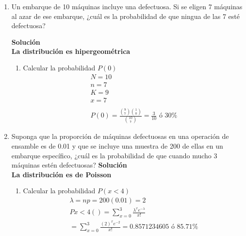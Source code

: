 \begin{enumerate}
    \item Un embarque de 10 máquinas incluye una defectuosa. Si se eligen 7 máquinas al azar de ese embarque, ¿cuál es la probabilidad de que ningua de las 7 esté defectuosa?
    
    \textbf{Solución}\\
    \textbf{La distribución es hipergeométrica}
    \begin{enumerate}
        
        \item Calcular la probabilidad $P(0)$ \\
        \begin{gather*}
        N = 10\\
        n = 7\\
        K=9\\
        x=7\\\\
        P(0)=\frac{\binom{9}{7}\binom{1}{0}}{\binom{10}{7}} = \frac{3}{10} \text{ ó }30\%
        \end{gather*}
    \end{enumerate}
    
    \item Suponga que la proporción de máquinas defectuosas en una operación de ensamble es de 0.01 y que se incluye una muestra de 200 de ellas en un embarque específico, ¿cuál es la probabilidad de que cuando mucho 3 máquinas estén defectuosas?
    \textbf{Solución}\\
    \textbf{La distribución es de Poisson}
    \begin{enumerate}
        \item Calcular la probabilidad $P(x<4)$ \\
        \begin{gather*}
        \lambda = np= 200(0.01) = 2\\
        Px<4()=\sum_{x=0}^{3}\frac{\lambda^{x}e^{-\lambda}}{x!}\\
        = \sum_{x=0}^{3}\frac{(2)^{x}e^{-2}}{x!}=0.8571234605\text{ ó } 85.71\%\\
        \end{gather*}
    \end{enumerate}
    

\end{enumerate}
